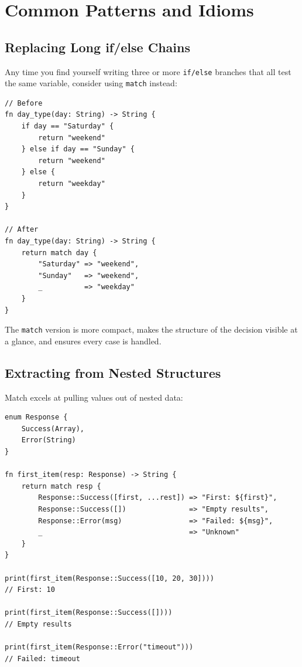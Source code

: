 \section{Common Patterns and Idioms}\label{sec:match-idioms}

\subsection{Replacing Long if/else Chains}\label{sec:replace-if-else}

Any time you find yourself writing three or more \lstinline|if/else| branches that all test the same variable, consider using \lstinline|match| instead:

\begin{lstlisting}[language=Lattice, caption={Before and after: if/else to match}]
// Before
fn day_type(day: String) -> String {
    if day == "Saturday" {
        return "weekend"
    } else if day == "Sunday" {
        return "weekend"
    } else {
        return "weekday"
    }
}

// After
fn day_type(day: String) -> String {
    return match day {
        "Saturday" => "weekend",
        "Sunday"   => "weekend",
        _          => "weekday"
    }
}
\end{lstlisting}

The \lstinline|match| version is more compact, makes the structure of the decision visible at a glance, and ensures every case is handled.

\subsection{Extracting from Nested Structures}\label{sec:nested-extraction}

Match excels at pulling values out of nested data:

\begin{lstlisting}[language=Lattice, caption={Extracting nested data}]
enum Response {
    Success(Array),
    Error(String)
}

fn first_item(resp: Response) -> String {
    return match resp {
        Response::Success([first, ...rest]) => "First: ${first}",
        Response::Success([])               => "Empty results",
        Response::Error(msg)                => "Failed: ${msg}",
        _                                   => "Unknown"
    }
}

print(first_item(Response::Success([10, 20, 30])))
// First: 10

print(first_item(Response::Success([])))
// Empty results

print(first_item(Response::Error("timeout")))
// Failed: timeout
\end{lstlisting}

